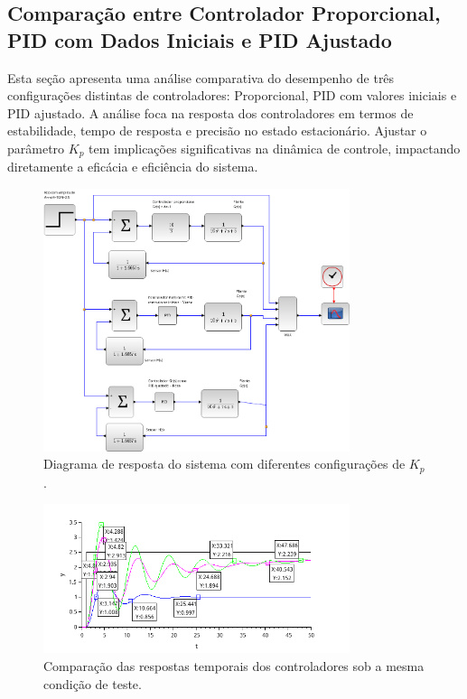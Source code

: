 \subsection{Comparação entre Controlador Proporcional, PID com Dados Iniciais e PID Ajustado}
Esta seção apresenta uma análise comparativa do desempenho de três configurações distintas de controladores: Proporcional, PID com valores iniciais e PID ajustado. A análise foca na resposta dos controladores em termos de estabilidade, tempo de resposta e precisão no estado estacionário. Ajustar o parâmetro \(K_p\) tem implicações significativas na dinâmica de controle, impactando diretamente a eficácia e eficiência do sistema.

\begin{figure}[H]
    \centering
    \includegraphics[width=0.8\textwidth]{6-atividade/assets/d/diagrama-comparacao-proporcional-pid-pid-ajustado.png}
    \caption{Diagrama de resposta do sistema com diferentes configurações de \(K_p\).}
    \label{fig:diagrama-comparacao-proporcional-pid-pid-ajustado}
\end{figure}

\begin{figure}[H]
    \centering
    \includegraphics[width=0.8\textwidth]{6-atividade/assets/d/comparacao-proporcional-pid-pid-ajustado.png}
    \caption{Comparação das respostas temporais dos controladores sob a mesma condição de teste.}
    \label{fig:comparacao-proporcional-pid-pid-ajustado}
\end{figure}


